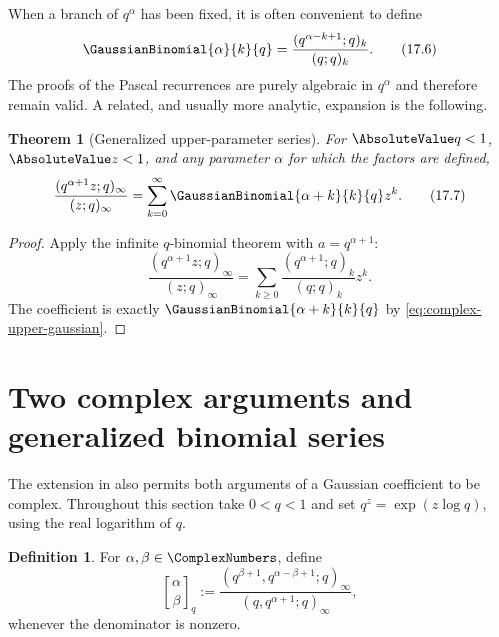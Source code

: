 \documentclass[11pt,a4paper,oneside,openany]{book}
\newtheorem{theorem}{Theorem}[chapter]
\theoremstyle{definition}
\newtheorem{definition}[definition]{Definition}
\theoremstyle{remark}
\begin{document}
When a branch of $q^\alpha$ has been fixed, it is often convenient to define
\[
 \GaussianBinomial{\alpha}{k}{q}
 =\frac{(q^{\alpha-k+1};q)_k}{(q;q)_k}.
 \tag{17.6}\label{eq:complex-upper-gaussian}
\]
The proofs of the Pascal recurrences are purely algebraic in $q^\alpha$ and therefore remain valid.  A related, and usually more analytic, expansion is the following.

\begin{theorem}[Generalized upper-parameter series]\label{thm:upper-parameter-series}
For $\AbsoluteValue q<1$, $\AbsoluteValue z<1$, and any parameter $\alpha$ for which the factors are defined,
\[
 \frac{(q^{\alpha+1}z;q)_\infty}{(z;q)_\infty}
 =\sum_{k=0}^{\infty}
   \GaussianBinomial{\alpha+k}{k}{q} z^k.
 \tag{17.7}\label{eq:upper-parameter-series}
\]
\end{theorem}

\begin{proof}
Apply the infinite $q$-binomial theorem with $a=q^{\alpha+1}$:
\[
 \frac{(q^{\alpha+1}z;q)_\infty}{(z;q)_\infty}
 =\sum_{k\ge0}\frac{(q^{\alpha+1};q)_k}{(q;q)_k}z^k.
\]
The coefficient is exactly $\GaussianBinomial{\alpha+k}{k}{q}$ by \eqref{eq:complex-upper-gaussian}.
\end{proof}

\section{Two complex arguments and generalized binomial series}

The extension in  also permits both arguments of a Gaussian coefficient to be complex.  Throughout this section take $0<q<1$ and set $q^z=\exp(z\log q)$, using the real logarithm of $q$.

\begin{definition}\label{def:complex-gaussian}
For $\alpha,\beta\in\ComplexNumbers$, define
\[
 \genfrac{[}{]}{0pt}{}{\alpha}{\beta}_q
 :=\frac{(q^{\beta+1},q^{\alpha-\beta+1};q)_\infty}
 {(q,q^{\alpha+1};q)_\infty},
 \tag{17.8}\label{eq:complex-gaussian}
\]
whenever the denominator is nonzero.
\end{definition}
\end{document}
